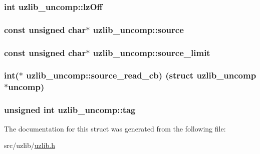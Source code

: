 \subsubsection[{\texorpdfstring{lz\+Off}{lzOff}}]{\setlength{\rightskip}{0pt plus 5cm}int uzlib\+\_\+uncomp\+::lz\+Off}\hypertarget{structuzlib__uncomp_a290337c263cc23cbe52683e823f99015}{}\label{structuzlib__uncomp_a290337c263cc23cbe52683e823f99015}
\subsubsection[{\texorpdfstring{source}{source}}]{\setlength{\rightskip}{0pt plus 5cm}const unsigned char$\ast$ uzlib\+\_\+uncomp\+::source}\hypertarget{structuzlib__uncomp_a88c09a94bc3e1d08ba10575c0723f4d0}{}\label{structuzlib__uncomp_a88c09a94bc3e1d08ba10575c0723f4d0}
\subsubsection[{\texorpdfstring{source\+\_\+limit}{source_limit}}]{\setlength{\rightskip}{0pt plus 5cm}const unsigned char$\ast$ uzlib\+\_\+uncomp\+::source\+\_\+limit}\hypertarget{structuzlib__uncomp_a2997b62eae694dbc2bbe18bd4eefded9}{}\label{structuzlib__uncomp_a2997b62eae694dbc2bbe18bd4eefded9}
\subsubsection[{\texorpdfstring{source\+\_\+read\+\_\+cb}{source_read_cb}}]{\setlength{\rightskip}{0pt plus 5cm}int($\ast$ uzlib\+\_\+uncomp\+::source\+\_\+read\+\_\+cb) (struct {\bf uzlib\+\_\+uncomp} $\ast$uncomp)}\hypertarget{structuzlib__uncomp_a7ad7d067f6c27397a5a88498cf8af527}{}\label{structuzlib__uncomp_a7ad7d067f6c27397a5a88498cf8af527}
\subsubsection[{\texorpdfstring{tag}{tag}}]{\setlength{\rightskip}{0pt plus 5cm}unsigned int uzlib\+\_\+uncomp\+::tag}\hypertarget{structuzlib__uncomp_aba6db88f0dd800fccdbed95ac9b04aad}{}\label{structuzlib__uncomp_aba6db88f0dd800fccdbed95ac9b04aad}


The documentation for this struct was generated from the following file\+:\begin{DoxyCompactItemize}
\item 
src/uzlib/\hyperlink{uzlib_8h}{uzlib.\+h}\end{DoxyCompactItemize}
